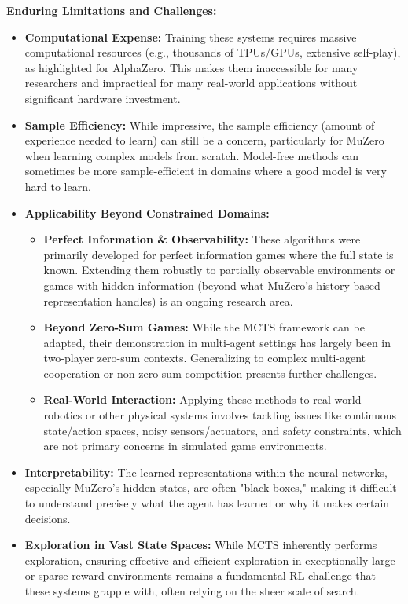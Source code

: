 \documentclass[11pt,a4paper]{article}
\begin{document}
\textbf{Enduring Limitations and Challenges:}
\begin{itemize}
    \item \textbf{Computational Expense:} Training these systems requires massive computational resources (e.g., thousands of TPUs/GPUs, extensive self-play), as highlighted for AlphaZero. This makes them inaccessible for many researchers and impractical for many real-world applications without significant hardware investment.
    \item \textbf{Sample Efficiency:} While impressive, the sample efficiency (amount of experience needed to learn) can still be a concern, particularly for MuZero when learning complex models from scratch. Model-free methods can sometimes be more sample-efficient in domains where a good model is very hard to learn.
    \item \textbf{Applicability Beyond Constrained Domains:}
        \begin{itemize}
            \item \textbf{Perfect Information \& Observability:} These algorithms were primarily developed for perfect information games where the full state is known. Extending them robustly to partially observable environments or games with hidden information (beyond what MuZero's history-based representation handles) is an ongoing research area.
            \item \textbf{Beyond Zero-Sum Games:} While the MCTS framework can be adapted, their demonstration in multi-agent settings has largely been in two-player zero-sum contexts. Generalizing to complex multi-agent cooperation or non-zero-sum competition presents further challenges.
            \item \textbf{Real-World Interaction:} Applying these methods to real-world robotics or other physical systems involves tackling issues like continuous state/action spaces, noisy sensors/actuators, and safety constraints, which are not primary concerns in simulated game environments.
        \end{itemize}
    \item \textbf{Interpretability:} The learned representations within the neural networks, especially MuZero's hidden states, are often "black boxes," making it difficult to understand precisely what the agent has learned or why it makes certain decisions.
    \item \textbf{Exploration in Vast State Spaces:} While MCTS inherently performs exploration, ensuring effective and efficient exploration in exceptionally large or sparse-reward environments remains a fundamental RL challenge that these systems grapple with, often relying on the sheer scale of search.
\end{itemize}
\end{document}
